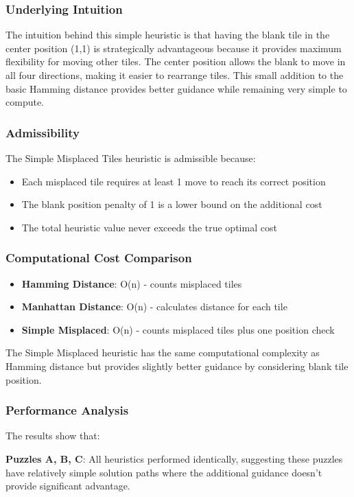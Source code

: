 \documentclass{article}
\begin{document}
\subsubsection{Underlying Intuition}
The intuition behind this simple heuristic is that having the blank tile in the center position (1,1) is strategically advantageous because it provides maximum flexibility for moving other tiles. The center position allows the blank to move in all four directions, making it easier to rearrange tiles. This small addition to the basic Hamming distance provides better guidance while remaining very simple to compute.

\subsubsection{Admissibility}
The Simple Misplaced Tiles heuristic is admissible because:
\begin{itemize}
\item Each misplaced tile requires at least 1 move to reach its correct position
\item The blank position penalty of 1 is a lower bound on the additional cost
\item The total heuristic value never exceeds the true optimal cost
\end{itemize}

\subsubsection{Computational Cost Comparison}
\begin{itemize}
\item \textbf{Hamming Distance}: O(n) - counts misplaced tiles
\item \textbf{Manhattan Distance}: O(n) - calculates distance for each tile
\item \textbf{Simple Misplaced}: O(n) - counts misplaced tiles plus one position check
\end{itemize}

The Simple Misplaced heuristic has the same computational complexity as Hamming distance but provides slightly better guidance by considering blank tile position.

\subsubsection{Performance Analysis}
The results show that:

\textbf{Puzzles A, B, C}: All heuristics performed identically, suggesting these puzzles have relatively simple solution paths where the additional guidance doesn't provide significant advantage.
\end{document}
